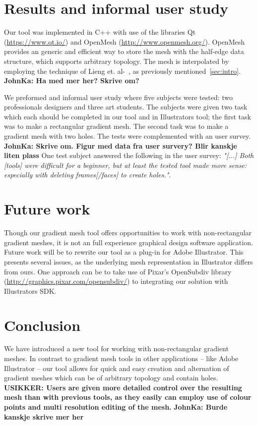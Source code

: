 \documentclass{egpubl}
\newcommand{\note}[3]{{\color{#2}\textbf{#1: #3}}}
\newcommand{\john}[1]{\note{JohnKa}{RubineRed}{#1}}
\newcommand{\unsure}[1]{\note{USIKKER}{Green}{#1}}
\begin{document}
	\section{Results and informal user study}
	\label{sec:results}
	
	
	Our tool was implemented in C++ with use of the libraries Qt (\url{https://www.qt.io/}) and OpenMesh (\url{http://www.openmesh.org/}). OpenMesh provides an generic and efficient way to store the mesh with the half-edge data structure, which supports arbitrary topology. The mesh is interpolated by employing the technique of Lieng et. al-~\cite{Lieng:2016}, as previously mentioned~\ref{sec:intro}. \john{Ha med mer her? Skrive om?}
	
	We preformed and informal user study where five subjects were tested: two  professionals designers and three art students. The subjects were given two task which each should be completed in our tool and in Illustrators tool; the first task was to make a rectangular gradient mesh. The second task was to make a gradient mesh with two holes. The tests were complemented with an user survey. \john{Skrive om. Figur med data fra user survery? Blir kanskje liten plass} One test subject answered the following in the user survey: \textit{"[...] Both [tools] were difficult for a beginner, but at least the tested tool made more sense: especially with deleting frames[/faces] to create holes."}.
	
	\section{Future work}
	\label{sec:FW}
	
	Though our gradient mesh tool offers opportunities to work with non-rectangular gradient meshes, it is not an full experience graphical design software application. Future work will be to rewrite our tool as a plug-in for Adobe Illustrator. This presents several issues, as the underlying mesh representation in Illustrator differs from ours. One approach can be to take use of Pixar's OpenSubdiv library (\url{http://graphics.pixar.com/opensubdiv/}) to integrating our solution with Illustrators SDK.
	
	\section{Conclusion}
	
	We have introduced a new tool for working with non-rectangular gradient meshes. In contrast to gradient mesh tools in other applications -- like Adobe Illustrator -- our tool allows for quick and easy creation and alternation of gradient meshes which can be of arbitrary topology and contain holes. \unsure{Users are given more detailed control over the resulting mesh than with previous tools, as they easily can employ use of colour points and multi resolution editing of the mesh.}  \john{ Burde kanskje skrive mer her}
	
	
	
	
	
\end{document}
